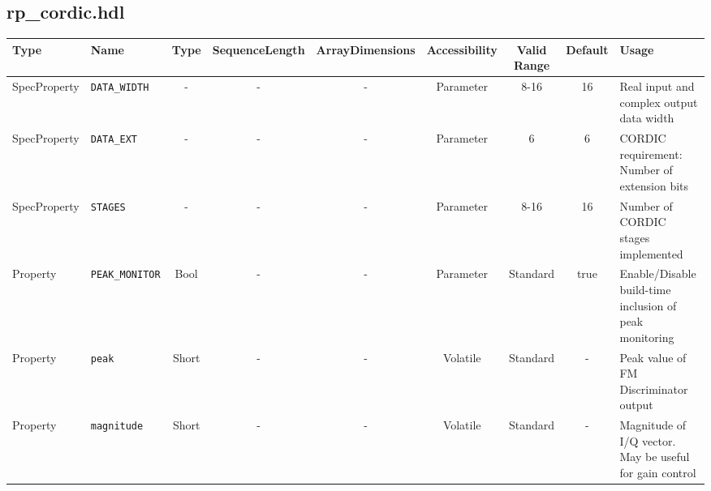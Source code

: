 \documentclass{article}
\def\comp{rp\_cordic}
\begin{document}
\begin{landscape}
	\subsection*{\comp.hdl}
	\begin{scriptsize}
		\begin{longtable}{|p{3cm}|p{2cm}|c|c|c|c|c|c|p{6cm}|}
			\hline
			\rowcolor{blue}
			Type         & Name              & Type  & SequenceLength & ArrayDimensions & Accessibility & Valid Range & Default & Usage                                                    \\
			\hline
			SpecProperty & \verb+DATA_WIDTH+ & -     & -              & -               & Parameter     & 8-16        & 16      & Real input and complex output data width                 \\
			\hline
			SpecProperty & \verb+DATA_EXT+   & -     & -              & -               & Parameter     & 6           & 6       & CORDIC requirement: Number of extension bits                 \\
			\hline
			SpecProperty & \verb+STAGES+     & -     & -              & -               & Parameter     & 8-16        & 16      & Number of CORDIC stages implemented                      \\
			\hline
			Property & \verb+PEAK_MONITOR+     & Bool     & -              & -               & Parameter     & Standard        & true      & Enable/Disable build-time inclusion of peak monitoring          \\
			\hline
			Property     & \verb+peak+  & Short & -              & -               & Volatile      & Standard    & -       & Peak value of FM Discriminator output \\
			\hline
			Property     & \verb+magnitude+  & Short & -              & -               & Volatile      & Standard    & -       & Magnitude of I/Q vector. May be useful for gain control \\
			\hline

		\end{longtable}
	\end{scriptsize}


\end{landscape}
\end{document}
